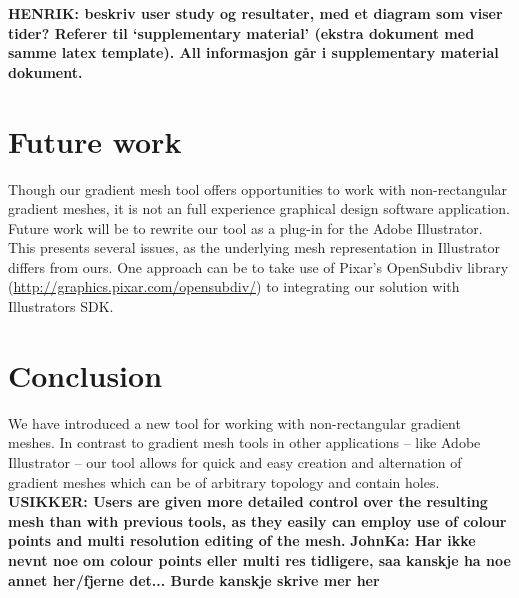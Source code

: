 \documentclass{egpubl}
\newcommand{\note}[3]{{\color{#2}\textbf{#1: #3}}}
\newcommand{\henrik}[1]{\note{HENRIK}{WildStrawberry}{#1}}
\newcommand{\john}[1]{\note{JohnKa}{RubineRed}{#1}}
\newcommand{\unsure}[1]{\note{USIKKER}{Green}{#1}}
\begin{document}
	\henrik{beskriv user study og resultater, med et diagram som viser tider? Referer til `supplementary material' (ekstra dokument med samme latex template). All informasjon går i supplementary material dokument.}
	
	\section{Future work}
	\label{sec:FW}
	
	Though our gradient mesh tool offers opportunities to work with non-rectangular gradient meshes, it is not an full experience graphical design software application. Future work will be to rewrite our tool as a plug-in for the Adobe Illustrator. This presents several issues, as the underlying mesh representation in Illustrator differs from ours. One approach can be to take use of Pixar's OpenSubdiv library (\url{http://graphics.pixar.com/opensubdiv/}) to integrating our solution with Illustrators SDK.
	
	\section{Conclusion}
	
	We have introduced a new tool for working with non-rectangular gradient meshes. In contrast to gradient mesh tools in other applications -- like Adobe Illustrator -- our tool allows for quick and easy creation and alternation of gradient meshes which can be of arbitrary topology and contain holes. \unsure{Users are given more detailed control over the resulting mesh than with previous tools, as they easily can employ use of colour points and multi resolution editing of the mesh.}  \john{Har ikke nevnt noe om colour points eller multi res tidligere, saa kanskje ha noe annet her/fjerne det... Burde kanskje skrive mer her}
	
	
	
	
	
\end{document}
